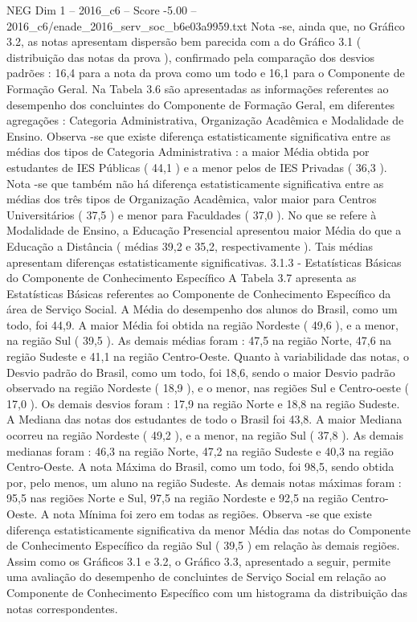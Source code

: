 \begin{textsample}{NEG Dim 1 – 2016\_c6 – Score -5.00 – 2016\_c6/enade\_2016\_serv\_soc\_b6e03a9959.txt}
Nota -se, ainda que, no Gráfico 3.2, as notas apresentam dispersão bem parecida com a do Gráfico 3.1 ( distribuição das notas da prova ), confirmado pela comparação dos desvios padrões : 16,4 para a nota da prova como um todo e 16,1 para o Componente de Formação Geral.
Na Tabela 3.6 são apresentadas as informações referentes ao desempenho dos concluintes do Componente de Formação Geral, em diferentes agregações : Categoria Administrativa, Organização Acadêmica e Modalidade de Ensino.
Observa -se que existe diferença estatisticamente significativa entre as médias dos tipos de Categoria Administrativa : a maior Média obtida por estudantes de IES Públicas ( 44,1 ) e a menor pelos de IES Privadas ( 36,3 ).
Nota -se que também não há diferença estatisticamente significativa entre as médias dos três tipos de Organização Acadêmica, valor maior para Centros Universitários ( 37,5 ) e menor para Faculdades ( 37,0 ).
No que se refere à Modalidade de Ensino, a Educação Presencial apresentou maior Média do que a Educação a Distância ( médias 39,2 e 35,2, respectivamente ).
Tais médias apresentam diferenças estatisticamente significativas. 3.1.3 - Estatísticas Básicas do Componente de Conhecimento Específico A Tabela 3.7 apresenta as Estatísticas Básicas referentes ao Componente de Conhecimento Específico da área de Serviço Social.
A Média do desempenho dos alunos do Brasil, como um todo, foi 44,9.
A maior Média foi obtida na região Nordeste ( 49,6 ), e a menor, na região Sul ( 39,5 ).
As demais médias foram : 47,5 na região Norte, 47,6 na região Sudeste e 41,1 na região Centro-Oeste.
Quanto à variabilidade das notas, o Desvio padrão do Brasil, como um todo, foi 18,6, sendo o maior Desvio padrão observado na região Nordeste ( 18,9 ), e o menor, nas regiões Sul e Centro-oeste ( 17,0 ).
Os demais desvios foram : 17,9 na região Norte e 18,8 na região Sudeste.
A Mediana das notas dos estudantes de todo o Brasil foi 43,8.
A maior Mediana ocorreu na região Nordeste ( 49,2 ), e a menor, na região Sul ( 37,8 ).
As demais medianas foram : 46,3 na região Norte, 47,2 na região Sudeste e 40,3 na região Centro-Oeste.
A nota Máxima do Brasil, como um todo, foi 98,5, sendo obtida por, pelo menos, um aluno na região Sudeste.
As demais notas máximas foram : 95,5 nas regiões Norte e Sul, 97,5 na região Nordeste e 92,5 na região Centro-Oeste.
A nota Mínima foi zero em todas as regiões.
Observa -se que existe diferença estatisticamente significativa da menor Média das notas do Componente de Conhecimento Específico da região Sul ( 39,5 ) em relação às demais regiões.
Assim como os Gráficos 3.1 e 3.2, o Gráfico 3.3, apresentado a seguir, permite uma avaliação do desempenho de concluintes de Serviço Social em relação ao Componente de Conhecimento Específico com um histograma da distribuição das notas correspondentes.

\end{textsample}
